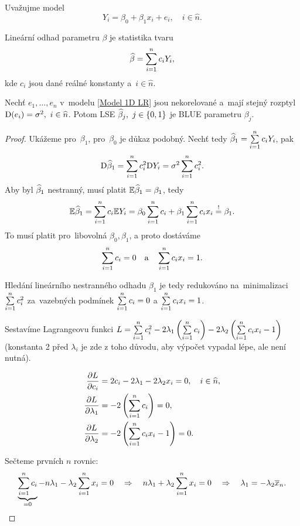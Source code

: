 Uvažujme model
 \begin{equation}
	Y_i = \beta_0 + \beta_1 x_i + e_i, \quad i\in\widehat{n}. \tag{$*$} \label{Model 1D LR}
 \end{equation}

\begin{define}
	Lineární odhad parametru $\beta$ je statistika tvaru
	 $$
		\widehat{\beta} = \sum\limits_{i=1}^{n} c_i Y_i,
	 $$
	kde $c_i$ jsou dané reálné konstanty a~$i  \in\widehat{n} $.
\end{define}

\begin{theorem}
	Nechť $e_1,..., e_n$ v~modelu \eqref{Model 1D LR} jsou nekorelované a~mají stejný rozptyl $\mathrm{D}(e_i) = \sigma^2,~ i\in\widehat{n} $. Potom LSE $\widehat{\beta}_j,~j\in\{0,1\}$ je BLUE parametru $\beta_j$.
	
\begin{proof}
	Ukážeme pro~$\beta_1$, pro~$\beta_0$ je důkaz podobný. Nechť tedy $\widehat{\beta}_1 = \sum\limits_{i=1}^{n} c_i Y_i$, pak	
	 $$\mathrm{D} \widehat{\beta}_1 = \sum\limits_{i=1}^{n} c_i^2 \mathrm{D} Y_i = \sigma^2 \sum\limits_{i=1}^{n} c_i^2.$$	
	Aby byl $\widehat{\beta}_1$ nestranný, musí platit $\mathbb{E} \widehat{\beta}_1 = \beta_1$, tedy
	$$\mathbb{E} \widehat{\beta}_1 = \sum\limits_{i=1}^{n} c_i \mathbb{E} Y_i = \beta_0 \sum\limits_{i=1}^{n} c_i + \beta_1 \sum\limits_{i=1}^{n} c_i x_i \overset{!}{ = } \beta_1.$$
	To musí platit pro~libovolná $\beta_0, \beta_1$, a proto dostáváme
	 $$
		\sum\limits_{i=1}^{n} c_i = 0 \quad \text{a} \quad \sum\limits_{i=1}^{n} c_i x_i = 1.
	 $$
	
	Hledání lineárního nestranného odhadu $\beta_1$ je tedy redukováno na~minimalizaci $\sum\limits_{i=1}^{n} c_i^2$ za~vazebných podmínek $\sum\limits_{i=1}^{n} c_i = 0$ a $\sum\limits_{i=1}^{n} c_i x_i = 1$.
	
	Sestavíme Lagrangeovu funkci $L = \sum\limits_{i=1}^{n} c_i^2 - 2 \lambda_1 \left(\sum\limits_{i=1}^{n} c_i\right) - 2 \lambda_2 \left(\sum\limits_{i=1}^{n} c_i x_i - 1\right)$ (konstanta 2 před $\lambda_i$ je zde z toho důvodu, aby výpočet vypadal lépe, ale není nutná).
	
	\begin{align*}
		\frac{\partial L}{\partial c_i} & = 2 c_i - 2 \lambda_1 - 2 \lambda_2 x_i = 0, \quad i\in\widehat{n}, \\
		\frac{\partial L}{\partial \lambda_1} & = -2 \left(\sum\limits_{i=1}^{n} c_i\right) = 0, \\
		\frac{\partial L}{\partial \lambda_2} & = -2 \left(\sum\limits_{i=1}^{n} c_i x_i - 1\right) = 0.
	\end{align*}
	
	Sečteme prvních $n$ rovnic:
	 $$
		\underbrace{\sum\limits_{i=1}^{n} c_i}_{ = 0} - n \lambda_1 - \lambda_2 \sum\limits_{i=1}^{n} x_i = 0 \quad\Rightarrow\quad n\lambda_1 + \lambda_2 \sum\limits_{i=1}^{n} x_i = 0 \quad \Rightarrow \quad\lambda_1 = - \lambda_2 \overline{x}_n.
	 $$
	

\end{proof}
\end{theorem}
